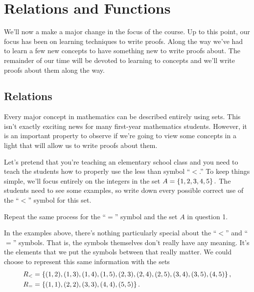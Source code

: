 \chapter{Relations and Functions}

We'll now a make a major change in the focus of the course.  Up to this point, our focus has been on learning techniques to write proofs.  Along the way we've had to learn a few new concepts to have something new to write proofs about.  The remainder of our time will be devoted to learning to concepts and we'll write proofs about them along the way.

\begin{center}
\end{center}

\section{Relations}

Every major concept in mathematics can be described entirely using sets.  This isn't exactly exciting news for many first-year mathematics students.  However, it is an important property to observe if we're going to view some concepts in a light that will allow us to write proofs about them.

\begin{question}
\item Let's pretend that you're teaching an elementary school class and you need to teach the students how to properly use the less than symbol ``$<$.''  To keep things simple, we'll focus entirely on the integers in the set $\displaystyle A = \left\{1,2,3,4,5\right\}.$  The students need to see some examples, so write down every possible correct use of the ``$<$'' symbol for this set.  
\vspace{2.5in}

\item Repeat the same process for the ``$=$'' symbol and the set $A$ in question 1.

\end{question}

In the examples above, there's nothing particularly special about the ``$<$'' and ``$=$'' symbols.  That is, the symbols themselves don't really have any meaning.  It's the elements that we put the symbols between that really matter.  We could choose to represent this same information with the sets
\begin{align*}
R_< &=\left\{(1,2),(1,3),(1,4),(1,5),(2,3),(2,4),(2,5),(3,4),(3,5),(4,5)\right\},\\
R_= &= \left\{(1,1),(2,2),(3,3),(4,4),(5,5)\right\}.
\end{align*}

